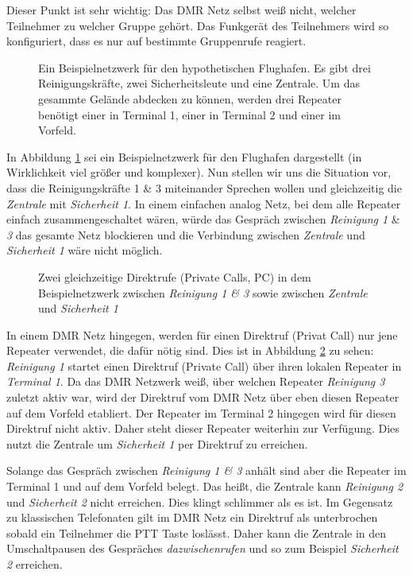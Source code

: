 \begin{merke}
 Dieser Punkt ist sehr wichtig: Das DMR Netz selbst weiß nicht, welcher Teilnehmer zu welcher Gruppe gehört. Das Funkgerät des Teilnehmers wird so konfiguriert, dass es nur auf bestimmte Gruppenrufe reagiert.
\end{merke}

\begin{figure}[!ht]
 \centering
 
 \caption{Ein Beispielnetzwerk für den hypothetischen Flughafen. Es gibt drei Reinigungskräfte, zwei Sicherheitsleute und eine Zentrale. Um das gesammte Gelände abdecken zu können, werden drei Repeater benötigt einer in Terminal 1, einer in Terminal 2 und einer im Vorfeld.} \label{fig:exnet1}
\end{figure}

In Abbildung \ref{fig:exnet1} sei ein Beispielnetzwerk für den Flughafen dargestellt (in Wirklichkeit viel größer und komplexer). Nun stellen wir uns die Situation vor, dass die Reinigungskräfte 1 \& 3 miteinander Sprechen wollen und gleichzeitig die \emph{Zentrale} mit \emph{Sicherheit 1}. In einem einfachen analog Netz, bei dem alle Repeater einfach zusammengeschaltet wären, würde das Gespräch zwischen \emph{Reinigung 1} \& \emph{3} das gesamte Netz blockieren und die Verbindung zwischen \emph{Zentrale} und \emph{Sicherheit 1} wäre nicht möglich. 

\begin{figure}[!ht]
 \centering
 
 \caption{Zwei gleichzeitige Direktrufe (Private Calls, PC) in dem Beispielnetzwerk zwischen \emph{Reinigung 1 \& 3} sowie zwischen \emph{Zentrale} und \emph{Sicherheit 1}} \label{fig:exnet2}
\end{figure}

In einem DMR Netz hingegen, werden für einen Direktruf (Privat Call) nur jene Repeater verwendet, die dafür nötig sind. Dies ist in Abbildung \ref{fig:exnet2} zu sehen: \emph{Reinigung 1} startet einen Direktruf (Private Call) über ihren lokalen Repeater in \emph{Terminal 1}. Da das DMR Netzwerk weiß, über welchen Repeater \emph{Reinigung 3} zuletzt aktiv war, wird der Direktruf vom DMR Netz über eben diesen Repeater auf dem Vorfeld etabliert. Der Repeater im Terminal 2 hingegen wird für diesen Direktruf nicht aktiv. Daher steht dieser Repeater weiterhin zur Verfügung. Dies nutzt die Zentrale um \emph{Sicherheit 1} per Direktruf zu erreichen. 

Solange das Gespräch zwischen \emph{Reinigung 1 \& 3} anhält sind aber die Repeater im Terminal 1 und auf dem Vorfeld belegt. Das heißt, die Zentrale kann \emph{Reinigung 2} und \emph{Sicherheit 2} nicht erreichen. Dies klingt schlimmer als es ist. Im Gegensatz zu klassischen Telefonaten gilt im DMR Netz ein Direktruf als unterbrochen sobald ein Teilnehmer die PTT Taste loslässt. Daher kann die Zentrale in den Umschaltpausen des Gespräches \emph{dazwischenrufen} und so zum Beispiel \emph{Sicherheit 2} erreichen. 

